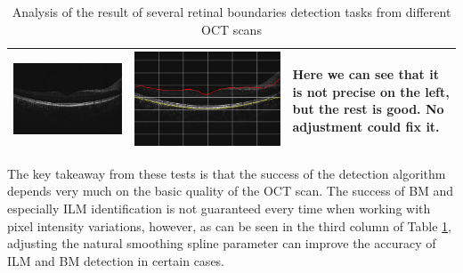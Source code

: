 \documentclass[12pt,a4paper]{scrartcl}
\begin{document}
\begin{table}[H]
\begin{tabular}{ | m{5cm} | m{5cm} | m{5cm} | }
\begin{minipage}{.3\textwidth}
      \includegraphics[width=\linewidth]{./images/TableOCT/base6.jpeg}
    \end{minipage}
    &
     \begin{minipage}{.3\textwidth}
      \includegraphics[width=\linewidth]{./images/TableOCT/ILM_BM_6.png}
    \end{minipage}
    & 
     Here we can see that it is not precise on the left, but the rest is good. No adjustment could fix it.
    \\ \hline%
  \end{tabular}
  \caption{Analysis of the result of several retinal boundaries detection tasks from different OCT scans}\label{tbl:analysis}
\end{table}


The key takeaway from these tests is that the success of the detection algorithm depends very much on the basic quality of the OCT scan. The success of BM and especially ILM identification is not guaranteed every time when working with pixel intensity variations, however, as can be seen in the third column of Table \ref{tbl:analysis}, adjusting the natural smoothing spline parameter can improve the accuracy of ILM and BM detection in certain cases. 
\end{document}
